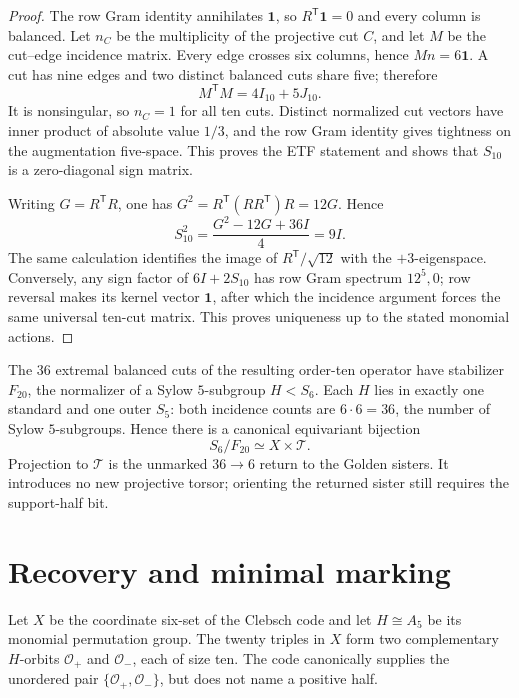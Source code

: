 \documentclass[11pt]{article}
\theoremstyle{definition}
\theoremstyle{remark}
\newcommand{\cT}{\mathcal T}
\begin{document}
\begin{proof}
The row Gram identity annihilates \(\mathbf1\), so
\(R^{\mathsf T}\mathbf1=0\) and every column is balanced.  Let \(n_C\)
be the multiplicity of the projective cut \(C\), and let \(M\) be the
cut--edge incidence matrix.  Every edge crosses six columns, hence
\(Mn=6\mathbf1\).  A cut has nine edges and two distinct balanced cuts
share five; therefore
\[
 M^{\mathsf T}M=4I_{10}+5J_{10}.
\]
It is nonsingular, so \(n_C=1\) for all ten cuts.  Distinct normalized
cut vectors have inner product of absolute value \(1/3\), and the row
Gram identity gives tightness on the augmentation five-space.  This proves
the ETF statement and shows that \(S_{10}\) is a zero-diagonal sign matrix.

Writing \(G=R^{\mathsf T}R\), one has
\(G^2=R^{\mathsf T}(RR^{\mathsf T})R=12G\).  Hence
\[
 S_{10}^2=\frac{G^2-12G+36I}{4}=9I.
\]
The same calculation identifies the image of
\(R^{\mathsf T}/\sqrt{12}\) with the \(+3\)-eigenspace.  Conversely, any
sign factor of \(6I+2S_{10}\) has row Gram spectrum \(12^5,0\); row
reversal makes its kernel vector \(\mathbf1\), after which the incidence
argument forces the same universal ten-cut matrix.  This proves uniqueness
up to the stated monomial actions.
\end{proof}

The \(36\) extremal balanced cuts of the resulting order-ten operator have
stabilizer \(F_{20}\), the normalizer of a Sylow \(5\)-subgroup \(H<S_6\).
Each \(H\) lies in exactly one standard and one outer \(S_5\): both incidence
counts are \(6\cdot6=36\), the number of Sylow \(5\)-subgroups.  Hence there
is a canonical equivariant bijection
\[
 S_6/F_{20}\simeq X\times\cT.
\]
Projection to \(\cT\) is the unmarked \(36\to6\) return to the Golden
sisters.  It introduces no new projective torsor; orienting the returned
sister still requires the support-half bit.

\section{Recovery and minimal marking}

Let \(X\) be the coordinate six-set of the Clebsch code and let
\(H\cong A_5\) be its monomial permutation group.  The twenty triples in
\(X\) form two complementary \(H\)-orbits
\(\mathcal O_+\) and \(\mathcal O_-\), each of size ten.  The code
canonically supplies the unordered pair
\(\{\mathcal O_+,\mathcal O_-\}\), but does not name a positive half.
\end{document}
